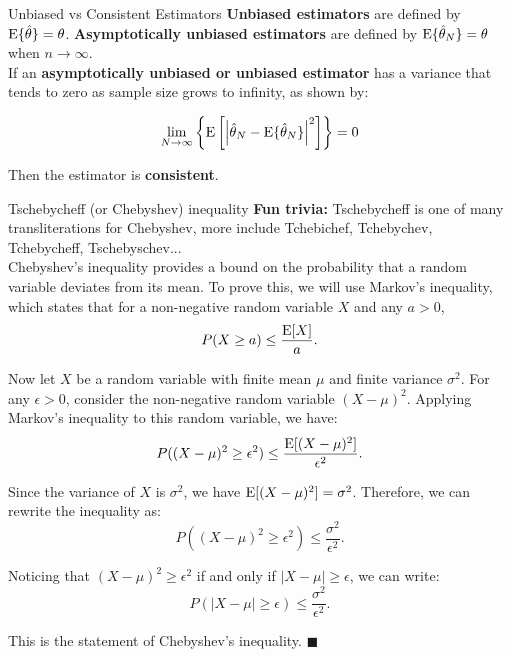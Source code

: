 \begin{definitionbox}{Unbiased vs Consistent Estimators}
    \textbf{Unbiased estimators} are defined by $\text{E}\{\hat{\theta}\} = \theta$. \textbf{Asymptotically unbiased estimators} are defined by $\text{E}\{\hat{\theta}_N\} = \theta$ when $n \to \infty$.\\

    If an\textbf{ asymptotically unbiased or unbiased estimator} has a variance that tends to zero as sample size grows to infinity, as shown by:

    \begin{equation}
        \lim_{N\to\infty}\left\{\text{E}\left[\left|\hat{\theta}_N-\text{E}\{\hat{\theta}_N\}\right|^2\right]\right\}=0
    \end{equation}

    Then the estimator is \textbf{consistent}.
\end{definitionbox}

\begin{sidenotebox}{Tschebycheff (or Chebyshev) inequality}
    \textbf{Fun trivia:} Tschebycheff is one of many transliterations for Chebyshev, more include Tchebichef, Tchebychev, Tchebycheff, Tschebyschev...\\

Chebyshev's inequality provides a bound on the probability that a random variable deviates from its mean. To prove this, we will use Markov's inequality, which states that for a non-negative random variable \(X\) and any \(a > 0\),
\begin{equation}
    P(X \geq a) \leq \frac{\text{E}[X]}{a}.
\end{equation}

Now let \(X\) be a random variable with finite mean \(\mu\) and finite variance \(\sigma^2\). For any \(\epsilon > 0\), consider the non-negative random variable \((X - \mu)^2\). Applying Markov's inequality to this random variable, we have:
\begin{equation}
    P((X - \mu)^2 \geq \epsilon^2) \leq \frac{\text{E}[(X - \mu)^2]}{\epsilon^2}.
\end{equation}

Since the variance of \(X\) is \(\sigma^2\), we have \(\text{E}[(X - \mu)^2] = \sigma^2\). Therefore, we can rewrite the inequality as:
\begin{equation}
    P((X - \mu)^2 \geq \epsilon^2) \leq \frac{\sigma^2}{\epsilon^2}.
\end{equation}

Noticing that \((X - \mu)^2 \geq \epsilon^2\) if and only if \(|X - \mu| \geq \epsilon\), we can write:
\begin{equation}
    P(|X - \mu| \geq \epsilon) \leq \frac{\sigma^2}{\epsilon^2}.
\end{equation}

This is the statement of Chebyshev's inequality. \(\blacksquare\)

\end{sidenotebox}

